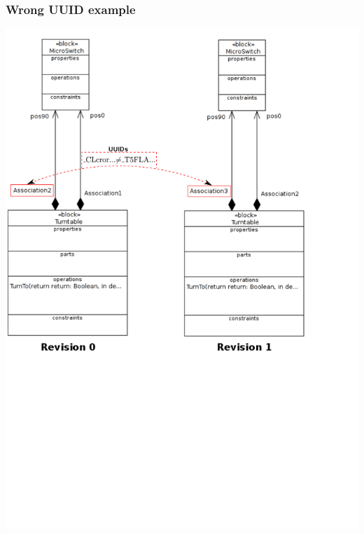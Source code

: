 \documentclass[10pt]{beamer}
\begin{document}
\begin{frame}
\frametitle{Wrong UUID example}
\begin{center}
\includegraphics[scale=0.32]{wrongUUIDs_examples_p3}\\
\end{center}

\end{frame}
\end{document}
